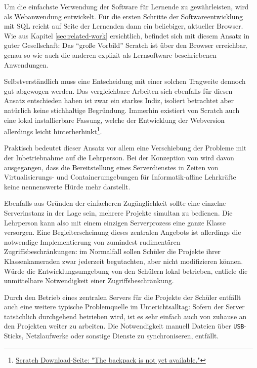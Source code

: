 Um die einfachste Verwendung der Software für Lernende zu gewährleisten, wird \idename{} als Webanwendung entwickelt. Für die ersten Schritte der Softwareentwicklung mit SQL reicht auf Seite der Lernenden dann ein beliebiger, aktueller Browser. Wie aus Kapitel \ref{sec:related-work}  ersichtlich, befindet sich \idename{} mit diesem Ansatz in guter Gesellschaft: Das ``große Vorbild'' Scratch ist über den Browser erreichbar, genau so wie auch die anderen explizit als Lernsoftware beschriebenen Anwendungen.

Selbstverständlich muss eine Entscheidung mit einer solchen Tragweite dennoch gut abgewogen werden. Das vergleichbare Arbeiten sich ebenfalls für diesen Ansatz entschieden haben ist zwar ein starkes Indiz, isoliert betrachtet aber natürlich keine stichhaltige Begründung. Immerhin existiert von Scratch auch eine lokal installierbare Fassung, welche der Entwicklung der Webversion allerdings leicht hinterherhinkt\footnote{\href{https://scratch.mit.edu/scratch2download/}{Scratch Download-Seite: "The backpack is not yet available."}}.

Praktisch bedeutet dieser Ansatz vor allem eine Verschiebung der Probleme mit der Inbetriebnahme auf die Lehrperson. Bei der Konzeption von \idename{} wird davon ausgegangen, dass die Bereitstellung eines Serverdienstes in Zeiten von Virtualisierungs- und Containerumgebungen für Informatik-affine Lehrkräfte keine nennenswerte Hürde mehr darstellt.

Ebenfalls aus Gründen der einfacheren Zugänglichkeit sollte eine einzelne Serverinstanz in der Lage sein, mehrere Projekte simultan zu bedienen. Die Lehrperson kann also mit einem einzigen Serverprozess eine ganze Klasse versorgen. Eine Begleiterscheinung dieses zentralen Angebots ist allerdings die notwendige Implementierung von zumindest rudimentären Zugriffsbeschränkungen: im Normalfall sollen Schüler die Projekte ihrer Klassenkameraden zwar jederzeit begutachten, aber nicht modifizieren können. Würde die Entwicklungsumgebung von den Schülern lokal betrieben, entfiele die unmittelbare Notwendigkeit einer Zugriffsbeschränkung.

Durch den Betrieb eines zentralen Servers für die Projekte der Schüler entfällt auch eine weitere typische Problemquelle im Unterichtsalltag: Sofern der Server tatsächlich durchgehend betrieben wird, ist es sehr einfach auch von zuhause an den Projekten weiter zu arbeiten. Die Notwendigkeit manuell Dateien über \texttt{USB}-Sticks, Netzlaufwerke oder sonstige Dienste zu synchroniseren, entfällt.


